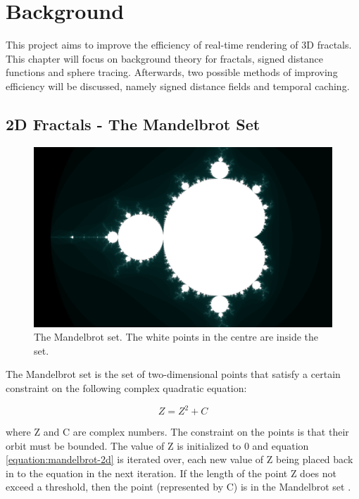 \chapter{Background}
\label{chapter2}

This project aims to improve the efficiency of real-time rendering of 3D fractals. This chapter will focus on background theory for fractals, signed distance functions and sphere tracing. Afterwards, two possible methods of improving efficiency will be discussed, namely signed distance fields and temporal caching.

\section{2D Fractals - The Mandelbrot Set}

\begin{figure}[ht]
	\centering
	\includegraphics[width=0.65\linewidth, frame]{Images/Mandelbrot-2D-Full.png}
	\caption{The Mandelbrot set. The white points in the centre are inside the set.}
	\label{figure:mandelbrot-2d-full}
\end{figure}

The Mandelbrot set is the set of two-dimensional points that satisfy a certain constraint on the following complex quadratic equation:

\begin{equation} \label{equation:mandelbrot-2d}
	Z = {Z^2} + C
\end{equation}

where Z and C are complex numbers. The constraint on the points is that their orbit must be bounded. The value of Z is initialized to 0 and equation \ref{equation:mandelbrot-2d} is iterated over, each new value of Z being placed back in to the equation in the next iteration. If the length of the point Z does not exceed a threshold, then the point (represented by C) is in the Mandelbrot set \cite{devaney1999mandelbrot}.\newline

